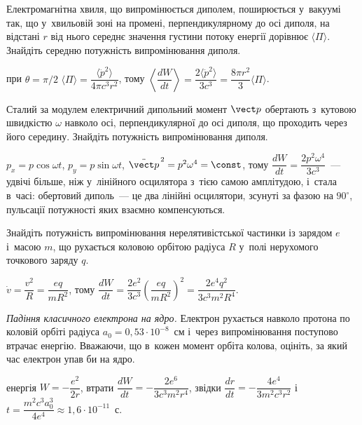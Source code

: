  {}


\begin{problem}\label{prb:DipolePowerFromFlux}
	Електромагнітна хвиля, що випромінюється диполем, поширюється у~вакуумі так, що у~хвильовій зоні на промені,
	перпендикулярному до осі диполя, на відстані $r$ від нього середнє значення густини потоку енергії дорівнює
	$\langle\Pi\rangle$. Знайдіть середню потужність випромінювання диполя.
	\begin{solution}
		при $\theta=\pi/2$ $\langle\Pi\rangle=\dfrac{\langle\ddot p^2\rangle}{4\pi c^3r^2}$, тому $\left\langle\dfrac{dW}{dt}\right\rangle=\dfrac{2\langle\ddot p^2\rangle}{3c^3}=\dfrac{8\pi r^2}{3}\langle\Pi\rangle$.
	\end{solution}
\end{problem}

\begin{problem}\label{prb:RotatingDipole}
	Сталий за модулем електричний дипольний момент $\vect p$ обертають з~кутовою швидкістю $\omega$ навколо осі,
	перпендикулярної до осі диполя, що проходить через його середину. Знайдіть потужність випромінювання диполя.
	\begin{solution}
		$p_x=p\cos\omega t$, $p_y=p\sin\omega t$, $\ddot{\vect p}^{\,2}=p^2\omega^4=\const$, тому $\dfrac{dW}{dt}=\dfrac{2p^2\omega^4}{3c^3}$~--- удвічі більше, ніж у~лінійного осцилятора з~тією самою амплітудою, і~стала в~часі: обертовий диполь~--- це два лінійні осцилятори, зсунуті за фазою на $90^\circ$, пульсації потужності яких взаємно компенсуються.
	\end{solution}
\end{problem}

\begin{problem}\label{prb:CoulombOrbitPower}
	Знайдіть потужність випромінювання нерелятивістської частинки із зарядом $e$ і~масою $m$, що рухається коловою орбітою
	радіуса $R$ у~полі нерухомого точкового заряду $q$.
	\begin{solution}
		$\dot v=\dfrac{v^2}{R}=\dfrac{eq}{mR^2}$, тому $\dfrac{dW}{dt}=\dfrac{2e^2}{3c^3}\left(\dfrac{eq}{mR^2}\right)^2=\dfrac{2e^4q^2}{3c^3m^2R^4}$.
	\end{solution}
\end{problem}

\begin{problem}\label{prb:AtomCollapse}
	\emph{Падіння класичного електрона на ядро.} Електрон рухається навколо протона по коловій орбіті радіуса
	$a_0=0{,}53\cdot10^{-8}$~см і~через випромінювання поступово втрачає енергію. Вважаючи, що в~кожен момент орбіта колова,
	оцініть, за який час електрон упав би на ядро.
	\begin{solution}
		енергія $W=-\dfrac{e^2}{2r}$, втрати $\dfrac{dW}{dt}=-\dfrac{2e^6}{3c^3m^2r^4}$, звідки $\dfrac{dr}{dt}=-\dfrac{4e^4}{3m^2c^3r^2}$ і~$t=\dfrac{m^2c^3a_0^3}{4e^4}\approx1{,}6\cdot10^{-11}$~с.
	\end{solution}
\end{problem}

